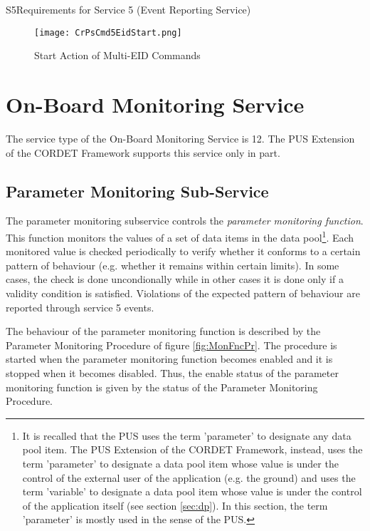 \documentclass{pnp_article}
\begin{document}
\begin{cr_req}{S5}{Requirements for Service 5 (Event Reporting Service)}
\end{cr_req}

\begin{figure}[H]
 \centering
 \texttt{[image: CrPsCmd5EidStart.png]}
 \caption{Start Action of Multi-EID Commands}
 \label{fig:Cmd5EidStart}
\end{figure}



\section{On-Board Monitoring Service}\label{sec:serv12}
The service type of the On-Board Monitoring Service is 12. The PUS Extension of the CORDET Framework supports this service only in part.

\subsection{Parameter Monitoring Sub-Service}
The parameter monitoring subservice controls the \textit{parameter monitoring function}. This function monitors the values of a set of data items in the data pool\footnote{It is recalled that the PUS uses the term 'parameter' to designate any data pool item. The PUS Extension of the CORDET Framework, instead, uses the term 'parameter' to designate a data pool item whose value is under the control of the external user of the application (e.g. the ground) and uses the term 'variable' to designate a data pool item whose value is under the control of the application itself (see section \ref{sec:dp}). In this section, the term 'parameter' is mostly used in the sense of the PUS.}. Each monitored value is checked periodically to verify whether it conforms to a certain pattern of behaviour (e.g. whether it remains within certain limits). In some cases, the check is done uncondionally while in other cases it is done only if a validity condition is satisfied. Violations of the expected pattern of behaviour are reported through service 5 events. 

The behaviour of the parameter monitoring function is described by the Parameter Monitoring Procedure of figure \ref{fig:MonFncPr}. The procedure is started when the parameter monitoring function becomes enabled and it is stopped when it becomes disabled. Thus, the enable status of the parameter monitoring function is given by the status of the Parameter Monitoring Procedure.
\end{document}
